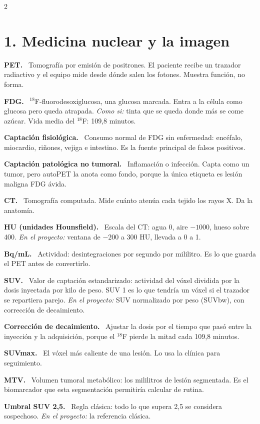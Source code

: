 \documentclass[9pt,a4paper]{extarticle}
\newcommand{\T}[1]{{\sffamily\bfseries\color{tinta}#1.}\ }
\newcommand{\aqui}[1]{{\color{acento}\itshape En el proyecto:} #1}
\newcommand{\como}[1]{{\itshape Como si:} #1}
\begin{document}
\begin{multicols}{2}

\section{1. Medicina nuclear y la imagen}

\T{PET} Tomografía por emisión de positrones. El paciente recibe un trazador radiactivo y el equipo mide desde dónde salen los fotones. Muestra función, no forma.

\T{FDG} $^{18}$F-fluorodesoxiglucosa, una glucosa marcada. Entra a la célula como glucosa pero queda atrapada. \como{tinta que se queda donde más se come azúcar.} Vida media del $^{18}$F: 109,8 minutos.

\T{Captación fisiológica} Consumo normal de FDG sin enfermedad: encéfalo, miocardio, riñones, vejiga e intestino. Es la fuente principal de falsos positivos.

\T{Captación patológica no tumoral} Inflamación o infección. Capta como un tumor, pero autoPET la anota como fondo, porque la única etiqueta es lesión maligna FDG ávida.

\T{CT} Tomografía computada. Mide cuánto atenúa cada tejido los rayos X. Da la anatomía.

\T{HU (unidades Hounsfield)} Escala del CT: agua 0, aire $-1000$, hueso sobre 400. \aqui{ventana de $-200$ a 300 HU, llevada a 0 a 1.}

\T{Bq/mL} Actividad: desintegraciones por segundo por mililitro. Es lo que guarda el PET antes de convertirlo.

\T{SUV} Valor de captación estandarizado: actividad del vóxel dividida por la dosis inyectada por kilo de peso. SUV 1 es lo que tendría un vóxel si el trazador se repartiera parejo. \aqui{SUV normalizado por peso (SUVbw), con corrección de decaimiento.}

\T{Corrección de decaimiento} Ajustar la dosis por el tiempo que pasó entre la inyección y la adquisición, porque el $^{18}$F pierde la mitad cada 109,8 minutos.

\T{SUVmax} El vóxel más caliente de una lesión. Lo usa la clínica para seguimiento.

\T{MTV} Volumen tumoral metabólico: los mililitros de lesión segmentada. Es el biomarcador que esta segmentación permitiría calcular de rutina.

\T{Umbral SUV 2,5} Regla clásica: todo lo que supera 2,5 se considera sospechoso. \aqui{la referencia clásica.}


\end{multicols}
\end{document}
